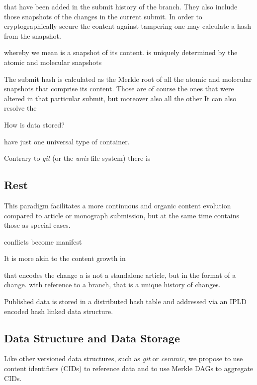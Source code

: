 \documentclass[14pt]{article}
\newcommand{\remark}[1]{{\color{purple} (#1)}}
\begin{document}
that have been added in the submit history of the branch. They also include those snapshots of the changes in the current submit. In order to cryptographically secure the content against tampering one may calculate a hash from the snapshot. 

whereby we mean   
is a snapshot of its content. is uniquely determined by the atomic and molecular snapshots

The submit hash is calculated as the Merkle root of all the atomic and molecular snapshots that comprise its content. Those are of course the ones that were altered in that particular submit, but moreover also all the other  It can also resolve the   

How is data stored?





have just one universal type of container.  


Contrary to \textit{git} \remark{or the \textit{unix} file system} there is 

\subsection{Rest}


 

This paradigm facilitates a more continuous and organic content evolution compared to article or monograph submission, but at the same time contains those as special cases.

conflicts become manifest

It is more akin to the content growth in 

that encodes the change a is not a standalone article, but in the format of a change. with reference to a branch, that is a unique history of changes.  

Published data is stored in a distributed hash table and addressed via an IPLD encoded hash linked data structure. 

\subsection{Data Structure and Data Storage} \label{ssc:datastructure}

Like other versioned data structures, such as \textit{git} or \textit{ceramic}, we propose to use content identifiers (CIDs) to reference data and to use Merkle DAGs to aggregate CIDs. 
\end{document}
